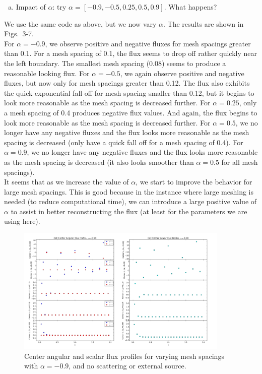 \documentclass[10pt]{article}
\begin{document}
\vspace{10pt}
\begin{enumerate}[(b)]
\item Impact of $\alpha$: try $\alpha = [-0.9, -0.5, 0.25, 0.5, 0.9]$. What happens?
\end{enumerate}

We use the same code as above, but we now vary $\alpha$. The results are shown in Figs.~3-7. \\

For $\alpha=-0.9$, we observe positive and negative fluxes for mesh spacings greater than 0.1. For a mesh spacing of 0.1, the flux seems to drop off rather quickly near the left boundary. The smallest mesh spacing (0.08) seems to produce a reasonable looking flux. For $\alpha=-0.5$, we again observe positive and negative fluxes, but now only for mesh spacings greater than 0.12. The flux also exhibits the quick exponential fall-off for mesh spacing smaller than 0.12, but it begins to look more reasonable as the mesh spacing is decreased further. For $\alpha=0.25$, only a mesh spacing of 0.4 produces negative flux values. And again, the flux begins to look more reasonable as the mesh spacing is decreased further. For $\alpha=0.5$, we no longer have any negative fluxes and the flux looks more reasonable as the mesh spacing is decreased (only have a quick fall off for a mesh spacing of 0.4). For $\alpha=0.9$, we no longer have any negative fluxes and the flux looks more reasonable as the mesh spacing is decreased (it also looks smoother than $\alpha=0.5$ for all mesh spacings).\\

It seems that as we increase the value of $\alpha$, we start to improve the behavior for large mesh spacings. This is good because in the instance where large meshing is needed (to reduce computational time), we can introduce a large positive value of $\alpha$ to assist in better reconstructing the flux (at least for the parameters we are using here).

\begin{figure}[H]
    \centering
    \includegraphics[width=0.9\textwidth]{Figures/FluxProfile_a=-09}
    \caption{Center angular and scalar flux profiles for varying mesh spacings with $\alpha = -0.9$, and no scattering or external source.}
    \label{fig3}
\end{figure}
\end{document}
